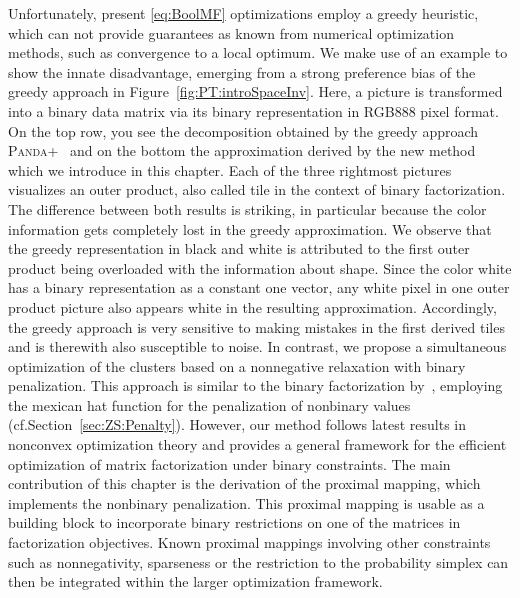 Unfortunately, present \ref{eq:BoolMF} optimizations employ a greedy heuristic, which can not provide guarantees as known from numerical optimization methods, such as convergence to a local optimum. We make use of an example to show the innate disadvantage, emerging from a strong preference bias of the greedy approach in Figure~\ref{fig:PT:introSpaceInv}. Here, a picture is transformed into a binary data matrix via its binary representation in RGB888 pixel format. On the top row, you see the decomposition obtained by the greedy approach \textsc{Panda+}~\citep{lucchese2014unifying} and on the bottom the approximation derived by the new method which we introduce in this chapter. Each of the three rightmost pictures visualizes an outer product, also called tile in the context of binary factorization. The difference between both results is striking, in particular because the color information gets completely lost in the greedy approximation. We observe that the greedy representation in black and white is attributed to the first outer product being overloaded with the information about shape. Since the color white has a binary representation as a constant one vector, any white pixel in one outer product picture also appears white in the resulting approximation. Accordingly, the greedy approach is very sensitive to making mistakes in the first derived tiles and is therewith also susceptible to noise. In contrast, we propose a simultaneous optimization of the clusters based on a nonnegative relaxation with binary penalization. This approach is similar to the binary factorization by~\cite{zhang2007binary}, employing the mexican hat function for the penalization of nonbinary values (cf.\@ Section~\ref{sec:ZS:Penalty}). However, our method follows latest results in nonconvex optimization theory and provides a general framework for the efficient optimization of matrix factorization under binary constraints. The main contribution of this chapter is the derivation of the proximal mapping, which implements the nonbinary penalization. This proximal mapping is usable as a building block to incorporate binary restrictions on one of the matrices in factorization objectives. Known proximal mappings involving other constraints such as nonnegativity, sparseness or the restriction to the probability simplex can then be integrated within the larger optimization framework.  

